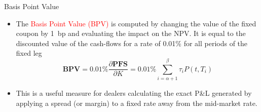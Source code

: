 \documentclass{beamer}
\begin{document}
\begin{frame}{Basis Point Value}
\begin{itemize}
	\item<1-> The \textcolor{red}{Basis Point Value (BPV)} is computed by changing the value of the fixed coupon by 1~bp and evaluating the impact on the NPV. It is equal to the discounted value of the cash-flows for a rate of 0.01\% for all periods of the fixed leg
	\begin{equation}
	\textbf{BPV} = 0.01\% \frac{\partial \textbf{PFS}}{\partial K} = 0.01\% \sum_{i=\alpha+1}^\beta\tau_iP(t,T_i)
	\end{equation}
	\item<2-> This is a useful measure for dealers calculating the exact P\&L generated by applying a spread (or margin) to a fixed rate away from the mid-market rate.
\end{itemize}
\end{frame}

%
\end{document}
